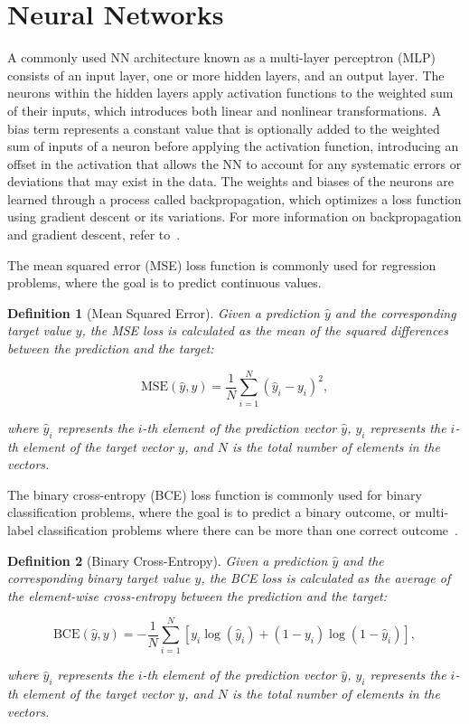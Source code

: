 \documentclass[ppgc,diss,english]{iiufrgs}
\newtheorem{definition}{Definition}
\begin{document}
\section{Neural Networks}
\label{sec:background-neural-nets}
A commonly used NN architecture known as a multi-layer perceptron (MLP) consists of an input layer, one or more hidden layers, and an output layer. The neurons within the hidden layers apply activation functions to the weighted sum of their inputs, which introduces both linear and nonlinear transformations. A bias term represents a constant value that is optionally added to the weighted sum of inputs of a neuron before applying the activation function, introducing an offset in the activation that allows the NN to account for any systematic errors or deviations that may exist in the data. The weights and biases of the neurons are learned through a process called backpropagation, which optimizes a loss function using gradient descent or its variations. For more information on backpropagation and gradient descent, refer to~\citet{Goodfellow.etal/2016}.

The mean squared error (MSE) loss function is commonly used for regression problems, where the goal is to predict continuous values.
\begin{definition}[Mean Squared Error]\label{def:mse}
Given a prediction $\hat{y}$ and the corresponding target value $y$, the MSE loss is calculated as the mean of the squared differences between the prediction and the target:

$$\text{MSE}(\hat{y}, y) = \frac{1}{N} \sum_{i=1}^{N} (\hat{y}_i - y_i)^2,$$

where $\hat{y}_i$ represents the $i$-th element of the prediction vector $\hat{y}$, $y_i$ represents the $i$-th element of the target vector $y$, and $N$ is the total number of elements in the vectors.
\end{definition}

The binary cross-entropy (BCE) loss function is commonly used for binary classification problems, where the goal is to predict a binary outcome, or multi-label classification problems where there can be more than one correct outcome~\cite{Tsoumakas.etal/2007}.
\begin{definition}[Binary Cross-Entropy]\label{def:mse}
Given a prediction $\hat{y}$ and the corresponding binary target value $y$, the BCE loss is calculated as the average of the element-wise cross-entropy between the prediction and the target:

$$\text{BCE}(\hat{y}, y) = -\frac{1}{N} \sum_{i=1}^{N} \left[y_i \log(\hat{y}_i) + (1 - y_i) \log(1 - \hat{y}_i)\right],$$

where $\hat{y}_i$ represents the $i$-th element of the prediction vector $\hat{y}$, $y_i$ represents the $i$-th element of the target vector $y$, and $N$ is the total number of elements in the vectors.
\end{definition}
\end{document}
